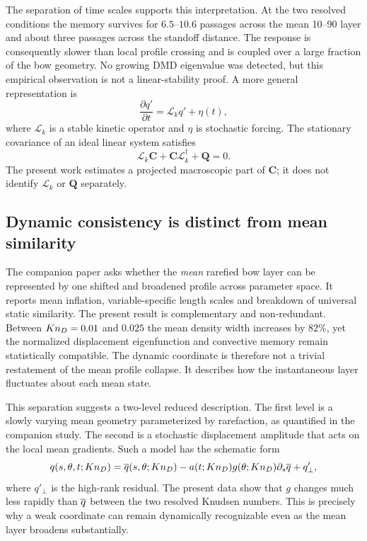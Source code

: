 The separation of time scales supports this interpretation. At the two resolved conditions the memory survives for $6.5$--$10.6$ passages across the mean 10--90 layer and about three passages across the standoff distance. The response is consequently slower than local profile crossing and is coupled over a large fraction of the bow geometry. No growing DMD eigenvalue was detected, but this empirical observation is not a linear-stability proof. A more general representation is
\begin{equation}
 \frac{\partial q'}{\partial t}=\mathcal L_k q'+\eta(t),
 \label{eq:stochastic_operator}
\end{equation}
where $\mathcal L_k$ is a stable kinetic operator and $\eta$ is stochastic forcing. The stationary covariance of an ideal linear system satisfies
\begin{equation}
 \mathcal L_k\bm C+\bm C\mathcal L_k^\dagger+\bm Q=0.
 \label{eq:lyap}
\end{equation}
The present work estimates a projected macroscopic part of $\bm C$; it does not identify $\mathcal L_k$ or $\bm Q$ separately.

\subsection{Dynamic consistency is distinct from mean similarity}
The companion paper \citep{RoohiShoja2026Mean} asks whether the \emph{mean} rarefied bow layer can be represented by one shifted and broadened profile across parameter space. It reports mean inflation, variable-specific length scales and breakdown of universal static similarity. The present result is complementary and non-redundant. Between $Kn_D=0.01$ and $0.025$ the mean density width increases by $82\%$, yet the normalized displacement eigenfunction and convective memory remain statistically compatible. The dynamic coordinate is therefore not a trivial restatement of the mean profile collapse. It describes how the instantaneous layer fluctuates about each mean state.

This separation suggests a two-level reduced description. The first level is a slowly varying mean geometry parameterized by rarefaction, as quantified in the companion study. The second is a stochastic displacement amplitude that acts on the local mean gradients. Such a model has the schematic form
\begin{equation}
 q(s,\theta,t;Kn_D)
 =\overline{q}(s,\theta;Kn_D)
 -a(t;Kn_D)g(\theta;Kn_D)\partial_s\overline{q}
 +q'_\perp,
 \label{eq:twolevel}
\end{equation}
where $q'_\perp$ is the high-rank residual. The present data show that $g$ changes much less rapidly than $\overline{q}$ between the two resolved Knudsen numbers. This is precisely why a weak coordinate can remain dynamically recognizable even as the mean layer broadens substantially.


